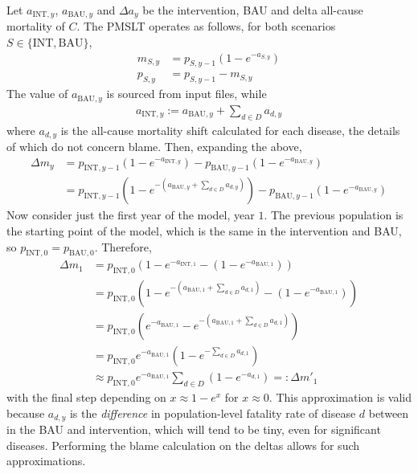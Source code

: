 \documentclass[]{article}
\begin{document}
Let $a_{\text{INT}, y}$, $a_{\text{BAU}, y}$ and $\Delta a_y$ be the intervention, BAU and delta all-cause mortality of $C$. The PMSLT operates as follows, for both scenarios $S \in \{\text{INT}, \text{BAU}\}$,
\begin{align*}
	m_{S, y} &= p_{S, y - 1} \left(1 - e^{-a_{S, y}}\right) \\
	p_{S, y} &= p_{S, y - 1} - m_{S, y}
\end{align*}
The value of $a_{\text{BAU}, y}$ is sourced from input files, while
\begin{align*}
	a_{\text{INT}, y} := a_{\text{BAU}, y} + \sum_{d \in D} a_{d, y}
\end{align*}
where $a_{d, y}$ is the all-cause mortality shift calculated for each disease, the details of which do not concern blame. Then, expanding the above,
\begin{align*}
	\Delta m_y &= p_{\text{INT}, y - 1} \left(1 - e^{-a_{\text{INT}, y}}\right) - p_{\text{BAU}, y - 1} \left(1 - e^{-a_{\text{BAU}, y}}\right) \\
	&= p_{\text{INT}, y - 1} \left(1 - e^{-(a_{\text{BAU}, y} + \sum_{d \in D} a_{d, y})}\right) - p_{\text{BAU}, y - 1} \left(1 - e^{-a_{\text{BAU}, y}}\right)
\end{align*}
Now consider just the first year of the model, year $1$. The previous population is the starting point of the model, which is the same in the intervention and BAU, so $p_{\text{INT}, 0} = p_{\text{BAU}, 0}$. Therefore,
\begin{align*}
	\Delta m_1 &= p_{\text{INT}, 0} \left(1 - e^{-a_{\text{INT}, 1}} - \left(1 - e^{-a_{\text{BAU}, 1}}\right)\right) \\
	&= p_{\text{INT}, 0} \left(1 - e^{-(a_{\text{BAU}, 1} + \sum_{d \in D} a_{d, 1})} - \left(1 - e^{-a_{\text{BAU}, 1}}\right)\right) \\
	&= p_{\text{INT}, 0} \left(e^{-a_{\text{BAU}, 1}} - e^{-(a_{\text{BAU}, 1} + \sum_{d \in D} a_{d, 1})}\right) \\
	&= p_{\text{INT}, 0} e^{-a_{\text{BAU}, 1}} \left(1 - e^{-\sum_{d \in D} a_{d, 1}}\right) \\
	&\approx p_{\text{INT}, 0} e^{-a_{\text{BAU}, 1}} \sum_{d \in D} \left(1 - e^{-a_{d, 1}}\right) =: \Delta m'_1
\end{align*}
with the final step depending on $x \approx 1 - e^x$ for $x \approx 0$. This approximation is valid because $a_{d,y}$ is the \textit{difference} in population-level fatality rate of disease $d$ between in the BAU and intervention, which will tend to be tiny, even for significant diseases. Performing the blame calculation on the deltas allows for such approximations.
\end{document}
